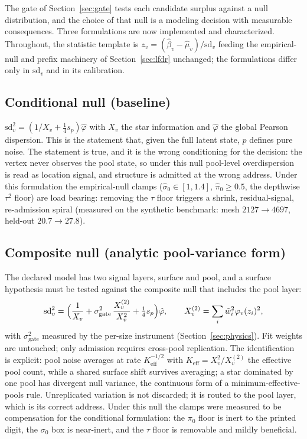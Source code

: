 \documentclass[11pt]{article}
\begin{document}
The gate of Section~\ref{sec:gate} tests each candidate surplus against a
null distribution, and the choice of that null is a modeling decision with
measurable consequences. Three formulations are now implemented and
characterized. Throughout, the statistic template is
$z_v = (\hat\beta_v - \hat\mu_v)/\mathrm{sd}_v$ feeding the empirical-null
and prefix machinery of Section~\ref{sec:lfdr} unchanged; the formulations
differ only in $\mathrm{sd}_v$ and in its calibration.

\subsection{Conditional null (baseline)}
$\mathrm{sd}_v^2 = (1/X_v + \tfrac14 s_p)\hat\varphi$ with $X_v$ the
star information and $\hat\varphi$ the global Pearson dispersion. This is
the statement that, given the full latent state, $p$ defines pure noise.
The statement is true, and it is the wrong conditioning for the decision:
the vertex never observes the pool state, so under this null pool-level
overdispersion is read as location signal, and structure is admitted at
the wrong address. Under this formulation the empirical-null clamps
($\hat\sigma_0\in[1,1.4]$, $\hat\pi_0\ge0.5$, the depthwise $\tau^2$
floor) are load bearing: removing the $\tau$ floor triggers a shrink,
residual-signal, re-admission spiral (measured on the synthetic
benchmark: mesh $2127\to4697$, held-out $20.7\to27.8$).

\subsection{Composite null (analytic pool-variance form)}
The declared model has two signal layers, surface and pool, and a surface
hypothesis must be tested against the composite null that includes the
pool layer:
\[
\mathrm{sd}_v^2 = \Bigl(\frac{1}{X_v}
 + \sigma^2_{\mathrm{gate}}\,\frac{X^{(2)}_v}{X_v^2}
 + \tfrac14 s_p\Bigr)\hat\varphi,
\qquad X^{(2)}_v = \sum_i \tilde w_i^2 \varphi_v(z_i)^2,
\]
with $\sigma^2_{\mathrm{gate}}$ measured by the per-size instrument
(Section~\ref{sec:physics}). Fit weights are untouched; only admission
requires cross-pool replication. The identification is explicit: pool
noise averages at rate $K_{\mathrm{eff}}^{-1/2}$ with
$K_{\mathrm{eff}} = X_v^2/X^{(2)}_v$ the effective pool count, while a
shared surface shift survives averaging; a star dominated by one pool has
divergent null variance, the continuous form of a minimum-effective-pools
rule. Unreplicated variation is not discarded; it is routed to the pool
layer, which is its correct address. Under this null the clamps were
measured to be compensation for the conditional formulation: the $\pi_0$
floor is inert to the printed digit, the $\sigma_0$ box is near-inert, and
the $\tau$ floor is removable and mildly beneficial.
\end{document}
